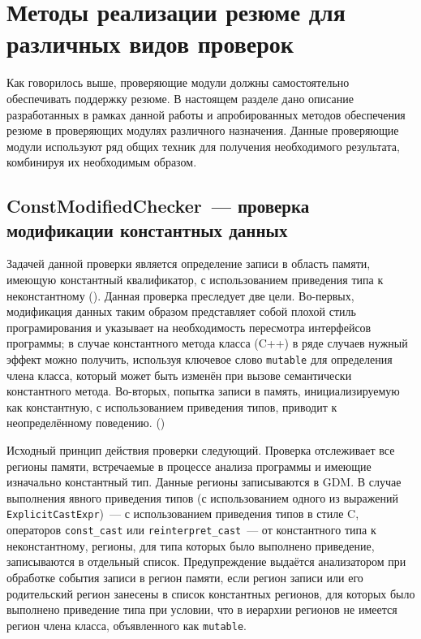 \section{Методы реализации резюме для различных видов проверок}

Как говорилось выше, проверяющие модули должны самостоятельно обеспечивать поддержку резюме. В настоящем разделе дано описание разработанных в рамках данной работы и апробированных методов обеспечения резюме в проверяющих модулях различного назначения. Данные проверяющие модули используют ряд общих техник для получения необходимого результата, комбинируя их необходимым образом.

\subsection{ConstModifiedChecker~--- проверка модификации константных данных}

Задачей данной проверки является определение записи в область памяти, имеющую константный квалификатор, с использованием приведения типа к неконстантному (). Данная проверка преследует две цели. Во-первых, модификация данных таким образом представляет собой плохой стиль програмирования и указывает на необходимость пересмотра интерфейсов программы; в случае константного метода класса (C++) в ряде случаев нужный эффект можно получить, используя ключевое слово \texttt{mutable} для определения члена класса, который может быть изменён при вызове семантически константного метода. Во-вторых, попытка записи в память, инициализируемую  как константную, с использованием приведения типов, приводит к неопределённому поведению. ()

Исходный принцип действия проверки следующий. Проверка отслеживает все регионы памяти, встречаемые в процессе анализа программы и имеющие изначально константный тип. Данные регионы записываются в GDM. В случае выполнения явного приведения типов (с использованием одного из выражений \texttt{ExplicitCastExpr})~--- с использованием приведения типов в стиле C, операторов \texttt{const\_cast} или \texttt{reinterpret\_cast}~--- от константного типа к неконстантному, регионы, для типа которых было выполнено приведение, записываются в отдельный список. Предупреждение выдаётся анализатором при обработке события записи в регион памяти, если регион записи или его родительский регион занесены в список константных регионов, для которых было выполнено приведение типа при условии, что в иерархии регионов не имеется регион члена класса, объявленного как \texttt{mutable}.

